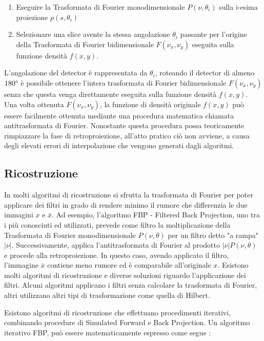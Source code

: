 \documentclass[a4paper,12pt, doubleside]{report}
\begin{document}
                    \begin{enumerate}
                        \item Eseguire la Trasformata di Fourier monodimensionale $P(\nu,\theta_i)$ sulla i-esima proiezione $p(s,\theta_i)$
                        \item Selezionare una slice avente la stessa angolazione $\theta_i$ passante per l'origine della Trasformata di Fourier bidimensionale $F(\nu_x,\nu_y)$ eseguita sulla funzione densità $f(x,y)$.  
                    \end{enumerate}
                \par
                    L'angolazione del detector è rappresentata da $\theta_i$, roteando il detector di almeno $180\degree$ è possibile ottenere l'intera trasformata di Fourier bidimensionale $F(\nu_x,\nu_y)$ senza che questa venga direttamente eseguita sulla funzione densità $f(x,y)$.
                    Una volta ottenuta $F(\nu_x,\nu_y)$, la funzione di densità originale $f(x,y)$ può essere facilmente ottenuta mediante una procedura matematica chiamata antitrasformata di Fourier. Nonostante questa procedura possa teoricamente rimpiazzare la fase di retroproiezione, all'atto pratico ciò non avviene, a causa degli elevati errori di interpolazione che vengono generati dagli algoritmi.
            
            \subsection{Ricostruzione}
                \par
                    In molti algoritmi di ricostruzione si sfrutta la trasformata di Fourier per poter applicare dei filtri in grado di rendere minimo il rumore che differenzia le due immagini $x$ e $\bar{x}$. Ad esempio, l'algoritmo FBP - Filtered Back Projection, uno tra i più conosciuti ed utilizzati, prevede come filtro la moltiplicazione della Trasformata di Fourier monodimensionale $P(\nu,\theta)$ per un filtro detto "a rampa" $|\nu|$. Successivamente, applica l'antitrasformata di Fourier al prodotto $|\nu|P(\nu, \theta)$ e procede alla retroproiezione. In questo caso, avendo applicato il filtro, l'immagine $\bar{x}$ contiene meno rumore ed è comparabile all'originale $x$. Esistono molti algoritmi di ricostruzione e diverse soluzioni riguardo l'applicazione dei filtri. Alcuni algoritmi applicano i filtri senza calcolare la trasformata di Fourier, altri utilizzano altri tipi di trasformazione come quella di Hilbert. 
                \bigskip
                \par
                    Esistono algoritmi di ricostruzione che effettuano procedimenti iterativi, combinando procedure di Simulated Forward e Back Projection. Un algoritmo iterativo FBP, può essere matematicamente espresso come segue \cite{fessler}:
                   
\end{document}
